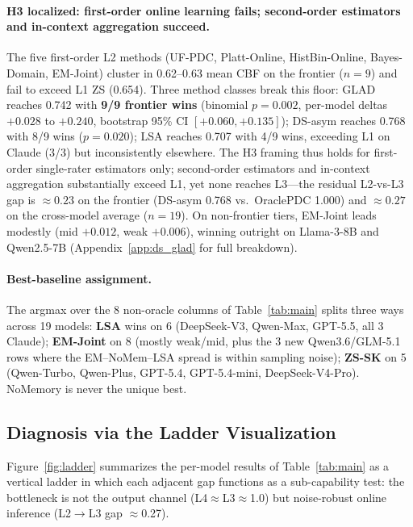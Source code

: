 \documentclass[11pt]{article}
\begin{document}
\paragraph{H3 localized: first-order online learning fails; second-order estimators and in-context aggregation succeed.} The five first-order L2 methods (UF-PDC, Platt-Online, HistBin-Online, Bayes-Domain, EM-Joint) cluster in 0.62--0.63 mean CBF on the frontier ($n{=}9$) and fail to exceed L1 ZS (0.654). Three method classes break this floor: GLAD reaches 0.742 with \textbf{9/9 frontier wins} (binomial $p=0.002$, per-model deltas $+0.028$ to $+0.240$, bootstrap 95\% CI $[+0.060,+0.135]$); DS-asym reaches 0.768 with 8/9 wins ($p=0.020$); LSA reaches 0.707 with 4/9 wins, exceeding L1 on Claude (3/3) but inconsistently elsewhere. The H3 framing thus holds for first-order single-rater estimators only; second-order estimators and in-context aggregation substantially exceed L1, yet none reaches L3---the residual L2-vs-L3 gap is $\approx 0.23$ on the frontier (DS-asym 0.768 vs.\ OraclePDC 1.000) and $\approx 0.27$ on the cross-model average ($n{=}19$). On non-frontier tiers, EM-Joint leads modestly (mid $+0.012$, weak $+0.006$), winning outright on Llama-3-8B and Qwen2.5-7B (Appendix~\ref{app:ds_glad} for full breakdown).

\paragraph{Best-baseline assignment.} The argmax over the 8 non-oracle columns of Table~\ref{tab:main} splits three ways across 19 models: \textbf{LSA} wins on 6 (DeepSeek-V3, Qwen-Max, GPT-5.5, all 3 Claude); \textbf{EM-Joint} on 8 (mostly weak/mid, plus the 3 new Qwen3.6/GLM-5.1 rows where the EM--NoMem--LSA spread is within sampling noise); \textbf{ZS-SK} on 5 (Qwen-Turbo, Qwen-Plus, GPT-5.4, GPT-5.4-mini, DeepSeek-V4-Pro). NoMemory is never the unique best.

\subsection{Diagnosis via the Ladder Visualization}
\label{sec:analysis}
\label{sec:bottleneck}

Figure~\ref{fig:ladder} summarizes the per-model results of Table~\ref{tab:main} as a vertical ladder in which each adjacent gap functions as a sub-capability test: the bottleneck is not the output channel (L4$\approx$L3$\approx$1.0) but noise-robust online inference (L2$\to$L3 gap $\approx$0.27).
\end{document}
